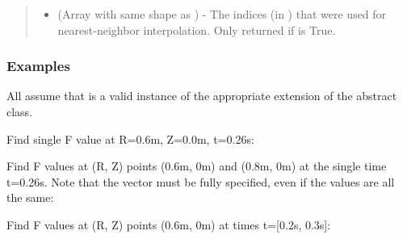 \documentclass[letterpaper,10pt,english]{sphinxmanual}
\begin{document}
\begin{fulllineitems}
\begin{fulllineitems}
\begin{quote}
\begin{description}
\begin{itemize}
\item {} 
 (Array with same shape as ) - The indices
(in ) that were used for
nearest-neighbor interpolation. Only returned if  is
True.

\end{itemize}


\end{description}\end{quote}
\subsubsection*{Examples}

All assume that  is a valid instance of the
appropriate extension of the {\hyperref[\detokenize{eqtools:eqtools.core.Equilibrium}]{}} abstract class.

Find single F value at R=0.6m, Z=0.0m, t=0.26s:

\begin{sphinxVerbatim}[commandchars=\\\{\}]
    
\end{sphinxVerbatim}

Find F values at (R, Z) points (0.6m, 0m) and (0.8m, 0m) at the
single time t=0.26s. Note that the  vector must be fully specified,
even if the values are all the same:

\begin{sphinxVerbatim}[commandchars=\\\{\}]
  \PYG{p}{[} \PYG{p}{]} \PYG{p}{[} \PYG{p}{]} 
\end{sphinxVerbatim}

Find F values at (R, Z) points (0.6m, 0m) at times t={[}0.2s, 0.3s{]}:

\begin{sphinxVerbatim}[commandchars=\\\{\}]
    \PYG{p}{[} \PYG{p}{]}
\end{sphinxVerbatim}


\end{fulllineitems}
\end{fulllineitems}
\end{document}
